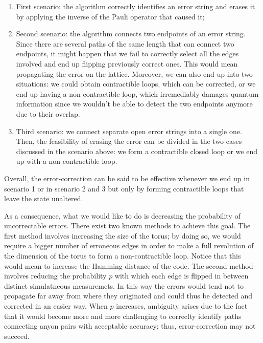 \documentclass{Configuration_Files/PoliMi3i_thesis}
\begin{document}
\begin{enumerate}
	\item First scenario: the algorithm correctly identifies an error string and erases it by applying the inverse of the Pauli operator that caused it;
	
	\item Second scenario: the algorithm connects two endpoints of an error string. Since there are several paths of the same length that can connect two endpoints, it might happen that we fail to correctly select all the edges involved and end up flipping previously correct ones. This would mean propagating the error on the lattice. \newline 
	Moreover, we can also end up into two situations: we could obtain contractible loops, which can be corrected, or we end up having a non-contractible loop, which irremediably damages quantum information since we wouldn't be able to detect the two endpoints anymore due to their overlap.
	
	\item Third scenario: we connect separate open error strings into a single one. Then, the feasibility of erasing the error can be divided in the two cases discussed in the scenario above: we form a contractible closed loop or we end up with a non-contractible loop. 
	
\end{enumerate}


Overall, the error-correction can be said to be effective whenever we end up in scenario 1 or in scenario 2 and 3 but only by forming contractible loops that leave the state unaltered. \newline

As a consequence, what we would like to do is decreasing the probability of uncorrectable errors. There exist two known methods to achieve this goal. The first method involves increasing the size of the torus; by doing so, we would require a bigger number of erroneous edges in order to make a full revolution of the dimension of the torus to form a non-contractible loop. Notice that this would mean to increase the Hamming distance of the code.\newline 
The second method involves reducing the probability $p$ with which each edge is flipped in between distinct simulatneous measuremets. In this way the errors would tend not to propagate far away from where they originated and could thus be detected and corrected in an easier way. When $p$ increases, ambiguity arises due to the fact that it would become more and more challenging to correclty identify paths connecting anyon pairs with acceptable accuracy; thus, error-correction may not succeed. \newline
\newline
\end{document}
